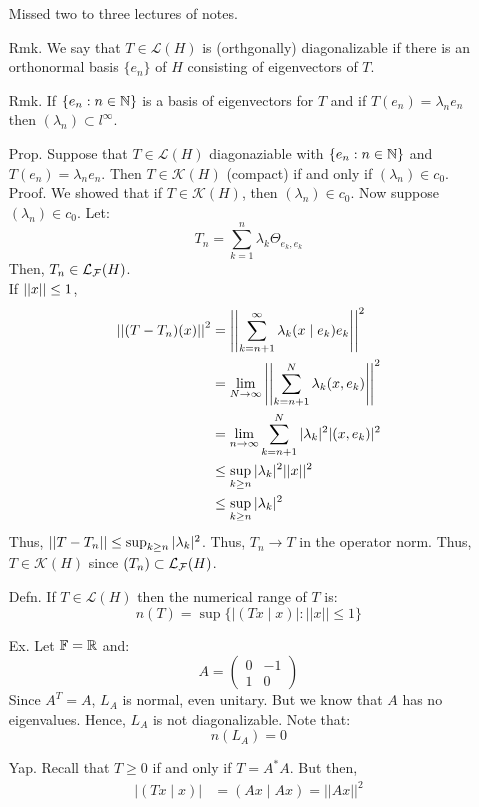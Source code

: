 \documentclass[12pt]{article}
\begin{document}
\begin{itemize}
    \newpage
    Missed two to three lectures of notes.
    \newpage
    \item[Rmk.] We say that $T \in \mathcal{L}(H)$ is (orthgonally) diagonalizable if there is an orthonormal basis $\{e_n\}$ of $H$ consisting of eigenvectors of $T$. \item[Rmk.] If $\{e_n : n \in \mathbb N\}$ is a basis of eigenvectors for $T$ and if $T(e_n) = \lambda_n e_n$ then $(\lambda_n) \subset l^\infty$.
    \item[Prop.] Suppose that $T \in \mathcal{L}(H)$ diagonaziable with $\{e_n : n \in \mathbb N\}$ and $T(e_n) = \lambda_n e_n$. Then $T \in \mathcal{K}(H)$ (compact) if and only if $(\lambda_n) \in c_0$. \bbni
    Proof. We showed that if $T \in \mathcal{K}(H)$, then $(\lambda_n) \in c_0$. Now suppose $(\lambda_n) \in c_0$. Let:
    \[ T_n = \sum_{k=1}^n \lambda_k \Theta_{e_k, e_k}\]
    Then, $T_n \in \mathcal{L}_{\mathcal{F}}(H)$. \\
    If $\left\vert\left\vert x\right\vert\right\vert \leq 1$, 
    \begin{align*}
        \left\vert\left\vert(T-T_n)(x)\right\vert\right\vert^2 &= \left\vert\left\vert\sum_{k=n+1}^\infty \lambda_k (x \mid e_k)e_k\right\vert\right\vert^2 \\
        &= \lim_{N \to \infty } \left\vert\left\vert\sum_{k=n+1}^N \lambda_k (x, e_k)\right\vert\right\vert^2 \\
        &= \lim_{n \to \infty} \sum_{k=n+1}^N |\lambda_k|^2 |(x, e_k)|^2 \\
        &\leq \sup_{k \geq n} |\lambda_k|^2 ||x||^2 \\
        &\leq \sup_{k \geq n} |\lambda_k|^2
    \end{align*}
    Thus, $\left\vert\left\vert T-T_n\right\vert\right\vert \leq \sup_{k \geq n} |\lambda_k|^2$. Thus, $T_n \to T$ in the operator norm. Thus, $T \in \mathcal{K}(H)$ since $(T_n) \subset \mathcal{L}_{\mathcal{F}}(H)$.
    \item[Defn.] If $T \in \mathcal{L}(H)$ then the numerical range of $T$ is: 
    \[ n(T) = \sup\{|(Tx \mid x)| : ||x|| \leq 1\}\]
    \item[Ex.] Let $\mathbb F = \mathbb R$ and:
    \[ A = \begin{pmatrix}
        0 & -1 \\
        1 & 0
    \end{pmatrix}\]
    Since $A^T = A$, $L_A$ is normal, even unitary. But we know that $A$ has no eigenvalues. Hence, $L_A$ is not diagonalizable. Note that: 
    \[ n(L_A) = 0 \]
    \item[Yap.] Recall that $T \geq 0$ if and only if $T = A^*A$. But then, 
    \begin{align*}
        |(Tx \mid x)| &= (Ax \mid Ax) = ||Ax||^2

\end{align*}
\end{itemize}
\end{document}
